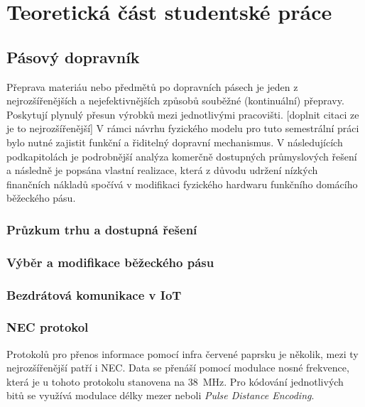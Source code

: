 \chapter{Teoretická část studentské práce}



\section{Pásový dopravník}
Přeprava materiáu nebo předmětů po dopravních pásech je jeden z nejrozšířenějších a nejefektivnějších způsobů souběžné (kontinuální) přepravy. Poskytují plynulý přesun výrobků mezi jednotlivými pracovišti. 
[doplnit citaci ze je to nejrozšířenější]
V rámci návrhu fyzického modelu pro tuto semestrální práci bylo nutné zajistit funkční a řiditelný dopravní mechanismus. V následujících podkapitolách je podrobnější analýza komerčně dostupných průmyslových řešení a následně je popsána vlastní realizace, která z důvodu udržení nízkých finančních nákladů spočívá v modifikaci fyzického hardwaru funkčního domácího běžeckého pásu. 
\subsection{Průzkum trhu a dostupná řešení}

\subsection{Výběr a modifikace běžeckého pásu}

\subsection{Bezdrátová komunikace v IoT}

\cite{IR}
\cite{IoT}

\subsection{NEC protokol}

Protokolů pro přenos informace pomocí infra červené paprsku je několik, mezi ty nejrozšířenější patří i NEC. Data se přenáší pomocí modulace nosné frekvence, která je u tohoto protokolu stanovena na \SI{38}{\mega\hertz}. Pro kódování jednotlivých bitů se využívá modulace délky mezer neboli \emph{Pulse Distance Encoding}. \cite{nec}

